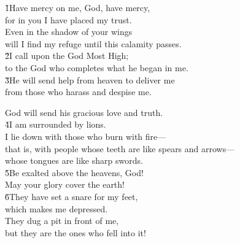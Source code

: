 
\begin{poetry}
\poeml \v{1}Have mercy on me, God, have mercy, \\
\poemll    for in you I have placed my trust. \\
\poeml Even in the shadow of your wings \\
\poemll    will I find my refuge until this calamity passes. \\
\poeml \v{2}I call upon the God Most High; \\
\poemll    to the God who completes what he began in me. \\
\poeml \v{3}He will send help from heaven to deliver me \\
\poemll    from those who harass and despise me.
\end{poetry}

\begin{poetry}
\poemlll       God will send his gracious love and truth. \\
\poeml \v{4}I am surrounded by lions. \\
\poemll    I lie down with those who burn with fire--- \\
\poeml that is, with people whose teeth are like spears and arrows--- \\
\poemll    whose tongues are like sharp swords. \\
\poeml \v{5}Be exalted above the heavens, God! \\
\poemll    May your glory cover the earth! \\
\poeml \v{6}They have set a snare for my feet, \\
\poemll    which makes me depressed. \\
\poeml They dug a pit in front of me, \\
\poemll    but they are the ones who fell into it!
\end{poetry}

